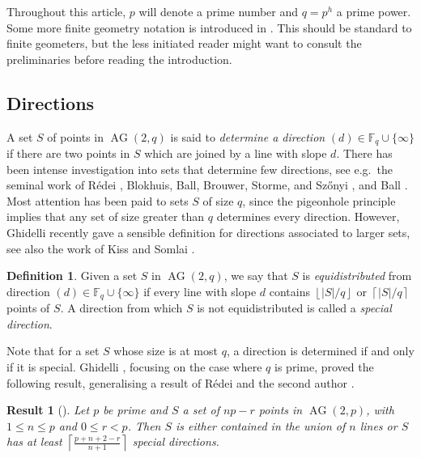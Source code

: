 \documentclass[12pt, a4paper]{article}
\newtheorem{res}[thm]{Result}
\theoremstyle{definition}
\newtheorem{df}[thm]{Definition}
\newcommand{\FF}{\mathbb F}
\newcommand{\floor}[1]{\left \lfloor #1 \right \rfloor}
\newcommand{\ceil}[1]{\left \lceil #1 \right \rceil}
\DeclareMathOperator{\AG}{AG}
\newcommand{\ag}{\AG}
\begin{document}
\bigskip

Throughout this article, $p$ will denote a prime number and $q=p^h$ a prime power.
Some more finite geometry notation is introduced in .
This should be standard to finite geometers, but the less initiated reader might want to consult the preliminaries before reading the introduction.

\subsection{Directions}

A set $S$ of points in $\ag(2,q)$ is said to \emph{determine a direction} $(d) \in \FF_q \cup \{\infty\}$ if there are two points in $S$ which are joined by a line with slope $d$.
There has been intense investigation into sets that determine few directions, see e.g.\ the seminal work of R\'edei \cite{lacunary}, Blokhuis, Ball, Brouwer, Storme, and Sz\H onyi \cite{BBBSS}, and Ball \cite{Ball03}.
Most attention has been paid to sets $S$ of size $q$, since the pigeonhole principle implies that any set of size greater than $q$ determines every direction.
However, Ghidelli \cite{Ghidelli} recently gave a sensible definition for directions associated to larger sets, see also the work of Kiss and Somlai \cite{Kiss:Somlai}.

\begin{df}
 \label{Df:SpecialDir}
 Given a set $S$ in $\ag(2,q)$, we say that $S$ is \emph{equidistributed} from direction $(d) \in \FF_q \cup \{\infty\}$ if every line with slope $d$ contains $\floor{|S|/q}$ or $\ceil{|S|/q}$ points of $S$.
 A direction from which $S$ is not equidistributed is called a \emph{special direction}.
\end{df}

Note that for a set $S$ whose size is at most $q$, a direction is determined if and only if it is special.
Ghidelli \cite{Ghidelli}, focusing on the case where $q$ is prime, proved the following result, generalising a result of R\'edei \cite{lacunary} and the second author \cite{Szonyi96, Szonyi99}.

\begin{res}[{\cite[Theorem 1.3]{Ghidelli}}]
 \label{Res:Ghidelli}
 Let $p$ be prime and $S$ a set of $np-r$ points in $\ag(2,p)$, with $1 \leq n \leq p$ and $0 \leq r < p$.
 Then $S$ is either contained in the union of $n$ lines or $S$ has at least $\ceil{\frac{p+n+2-r}{n+1}}$ special directions.
\end{res}
\end{document}
